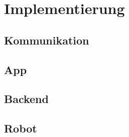 \section{Implementierung}
\subsection{Kommunikation}

\begin{comment}
Client
Server
Interpreter
Commandostruktur
\end{comment}

\subsection{App}

\begin{comment}
Aufbau
MVVM
Binding
GUI
Library
PageModel
\end{comment}

\subsection{Backend}

\begin{comment}
Aufbau
Interpreter
Mechanismen
GUI
\end{comment}

\subsection{Robot}

\begin{comment}
Aufbau
Robot
RobotController
EV3 Library
GUI
\end{comment}